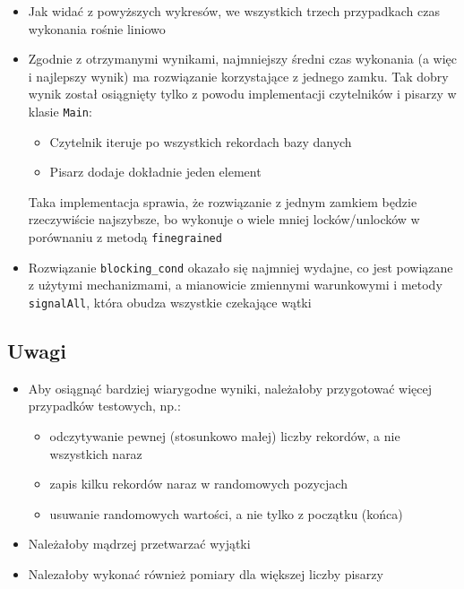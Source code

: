 \documentclass[11pt]{article}
\providecommand{\tightlist}{%
      \setlength{\itemsep}{0pt}\setlength{\parskip}{0pt}}
\begin{document}
\begin{itemize}
\item
  Jak widać z powyższych wykresów, we wszystkich trzech przypadkach czas
  wykonania rośnie liniowo
\item
  Zgodnie z otrzymanymi wynikami, najmniejszy średni czas wykonania (a
  więc i najlepszy wynik) ma rozwiązanie korzystające z jednego zamku.
  Tak dobry wynik został osiągnięty tylko z powodu implementacji
  czytelników i pisarzy w klasie \texttt{Main}:

  \begin{itemize}
  \tightlist
  \item
    Czytelnik iteruje po wszystkich rekordach bazy danych
  \item
    Pisarz dodaje dokładnie jeden element
  \end{itemize}

  Taka implementacja sprawia, że rozwiązanie z jednym zamkiem będzie
  rzeczywiście najszybsze, bo wykonuje o wiele mniej locków/unlocków w
  porównaniu z metodą \texttt{finegrained}
\item
  Rozwiązanie \texttt{blocking\_cond} okazało się najmniej wydajne, co
  jest powiązane z użytymi mechanizmami, a mianowicie zmiennymi
  warunkowymi i metody \texttt{signalAll}, która obudza wszystkie
  czekające wątki
\end{itemize}

    \hypertarget{uwagi}{%
\subsection{Uwagi}\label{uwagi}}

\begin{itemize}
\tightlist
\item
  Aby osiągnąć bardziej wiarygodne wyniki, należałoby przygotować więcej
  przypadków testowych, np.:

  \begin{itemize}
  \tightlist
  \item
    odczytywanie pewnej (stosunkowo małej) liczby rekordów, a nie
    wszystkich naraz
  \item
    zapis kilku rekordów naraz w randomowych pozycjach
  \item
    usuwanie randomowych wartości, a nie tylko z początku (końca)
  \end{itemize}
\item
  Należałoby mądrzej przetwarzać wyjątki
\item
  Nalezałoby wykonać również pomiary dla większej liczby pisarzy
\end{itemize}
\end{document}
